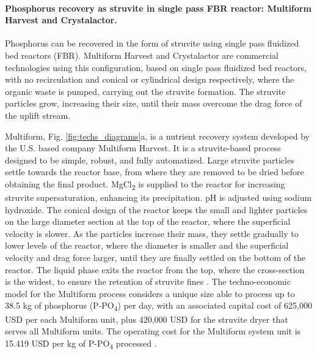 \begin{refsection}[referencesCh4]
\paragraph{Phosphorus recovery as struvite in single pass FBR reactor: Multiform Harvest and Crystalactor.}
Phosphorus can be recovered in the form of struvite using single pass fluidized bed reactors (FBR). Multiform Harvest and Crystalactor are commercial technologies using this configuration, based on single pass fluidized bed reactors, with no recirculation and conical or cylindrical design respectively, where the organic waste is pumped, carrying out the struvite formation. The struvite particles grow, increasing their size, until their mass overcome the drag force of the uplift stream.

Multiform, Fig. \ref{fig:techs_diagrams}a, is a nutrient recovery system developed by the U.S. based company Multiform Harvest. It is a struvite-based process designed to be simple, robust, and fully automatized. Large struvite particles settle towards the reactor base, from where they are removed to be dried before obtaining the final product. MgCl\textsubscript{2} is supplied to the reactor for increasing struvite supersaturation, enhancing its precipitation. pH is adjusted using sodium hydroxide. The conical design of the reactor keeps the small and lighter particles on the large diameter section at the top of the reactor, where the superficial velocity is slower. As the particles increase their mass, they settle gradually to lower levels of the reactor, where the diameter is smaller and the superficial velocity and drag force larger, until they are finally settled on the bottom of the reactor. The liquid phase exits the reactor from the top, where the cross-section is the widest, to ensure the retention of struvite fines \citep{Pearl2Kcost2}.
The techno-economic model for the Multiform process considers a unique size able to process up to 38.5 kg of phosphorus (P-PO\textsubscript{4}) per day, with an associated capital cost of 625,000 USD per each Multiform unit, plus 420,000 USD for the struvite dryer that serves all Multiform units. The operating cost for the Multiform system unit is 15.419 USD per kg of P-PO\textsubscript{4} processed \citep{Pearl2Kcost2}.


\end{refsection}

